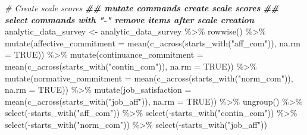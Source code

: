 \documentclass[
]{krantz}
\makeatletter
\newenvironment{Shaded}{\begin{snugshade}}{\end{snugshade}}
\newcommand{\AttributeTok}[1]{\textcolor[rgb]{0.61,0.61,0.61}{#1}}
\newcommand{\CommentTok}[1]{\textcolor[rgb]{0.37,0.37,0.37}{\textit{#1}}}
\newcommand{\ConstantTok}[1]{\textcolor[rgb]{0,0,0}{#1}}
\newcommand{\DocumentationTok}[1]{\textcolor[rgb]{0.37,0.37,0.37}{\textbf{\textit{#1}}}}
\newcommand{\FunctionTok}[1]{\textcolor[rgb]{0,0,0}{#1}}
\newcommand{\NormalTok}[1]{#1}
\newcommand{\OtherTok}[1]{\textcolor[rgb]{0.37,0.37,0.37}{#1}}
\newcommand{\SpecialCharTok}[1]{\textcolor[rgb]{0,0,0}{#1}}
\newcommand{\StringTok}[1]{\textcolor[rgb]{0.5,0.5,0.5}{#1}}
\newenvironment{kframe}{%
\medskip{}
\setlength{\fboxsep}{.8em}
 \def\at@end@of@kframe{}%
 \ifinner\ifhmode%
  \def\at@end@of@kframe{\end{minipage}}%
  \begin{minipage}{\columnwidth}%
 \fi\fi%
 \def\FrameCommand##1{\hskip\@totalleftmargin \hskip-\fboxsep
 \colorbox{shadecolor}{##1}\hskip-\fboxsep
     \hskip-\linewidth \hskip-\@totalleftmargin \hskip\columnwidth}%
 \MakeFramed {\advance\hsize-\width
   \@totalleftmargin\z@ \linewidth\hsize
   \@setminipage}}%
 {\par\unskip\endMakeFramed%
 \at@end@of@kframe}
\renewenvironment{Shaded}{\begin{kframe}}{\end{kframe}}
\makeatother
\begin{document}
\begin{Shaded}
\begin{Highlighting}[]
\CommentTok{\# Create scale scores}
\DocumentationTok{\#\# mutate commands create scale scores}
\DocumentationTok{\#\# select commands with "{-}" remove items after scale creation}
\NormalTok{analytic\_data\_survey }\OtherTok{\textless{}{-}}\NormalTok{ analytic\_data\_survey }\SpecialCharTok{\%\textgreater{}\%} 
  \FunctionTok{rowwise}\NormalTok{() }\SpecialCharTok{\%\textgreater{}\%} 
  \FunctionTok{mutate}\NormalTok{(}\AttributeTok{affective\_commitment =} \FunctionTok{mean}\NormalTok{(}\FunctionTok{c\_across}\NormalTok{(}\FunctionTok{starts\_with}\NormalTok{(}\StringTok{"aff\_com"}\NormalTok{)),}
                                     \AttributeTok{na.rm =} \ConstantTok{TRUE}\NormalTok{)) }\SpecialCharTok{\%\textgreater{}\%}
  \FunctionTok{mutate}\NormalTok{(}\AttributeTok{continuance\_commitment =} \FunctionTok{mean}\NormalTok{(}\FunctionTok{c\_across}\NormalTok{(}\FunctionTok{starts\_with}\NormalTok{(}\StringTok{"contin\_com"}\NormalTok{)),}
                                       \AttributeTok{na.rm =} \ConstantTok{TRUE}\NormalTok{)) }\SpecialCharTok{\%\textgreater{}\%}
  \FunctionTok{mutate}\NormalTok{(}\AttributeTok{normative\_commitment =} \FunctionTok{mean}\NormalTok{(}\FunctionTok{c\_across}\NormalTok{(}\FunctionTok{starts\_with}\NormalTok{(}\StringTok{"norm\_com"}\NormalTok{)),}
                                     \AttributeTok{na.rm =} \ConstantTok{TRUE}\NormalTok{)) }\SpecialCharTok{\%\textgreater{}\%}
  \FunctionTok{mutate}\NormalTok{(}\AttributeTok{job\_satisfaction =} \FunctionTok{mean}\NormalTok{(}\FunctionTok{c\_across}\NormalTok{(}\FunctionTok{starts\_with}\NormalTok{(}\StringTok{"job\_aff"}\NormalTok{)),}
                                 \AttributeTok{na.rm =} \ConstantTok{TRUE}\NormalTok{)) }\SpecialCharTok{\%\textgreater{}\%}
  \FunctionTok{ungroup}\NormalTok{() }\SpecialCharTok{\%\textgreater{}\%}
  \FunctionTok{select}\NormalTok{(}\SpecialCharTok{{-}}\FunctionTok{starts\_with}\NormalTok{(}\StringTok{"aff\_com"}\NormalTok{)) }\SpecialCharTok{\%\textgreater{}\%}
  \FunctionTok{select}\NormalTok{(}\SpecialCharTok{{-}}\FunctionTok{starts\_with}\NormalTok{(}\StringTok{"contin\_com"}\NormalTok{)) }\SpecialCharTok{\%\textgreater{}\%}
  \FunctionTok{select}\NormalTok{(}\SpecialCharTok{{-}}\FunctionTok{starts\_with}\NormalTok{(}\StringTok{"norm\_com"}\NormalTok{)) }\SpecialCharTok{\%\textgreater{}\%}
  \FunctionTok{select}\NormalTok{(}\SpecialCharTok{{-}}\FunctionTok{starts\_with}\NormalTok{(}\StringTok{"job\_aff"}\NormalTok{)) }
\end{Highlighting}
\end{Shaded}
\end{document}
